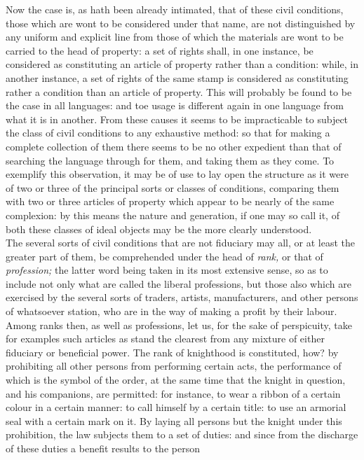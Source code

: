 \documentclass[12pt]{report}
\begin{document}
Now the case is, as hath been already intimated, that of these civil
conditions, those which are wont to be considered under that name, are
not distinguished by any uniform and explicit line from those of which
the materials are wont to be carried to the head of property: a set of
rights shall, in one instance, be considered as constituting an article
of property rather than a condition: while, in another instance, a set
of rights of the same stamp is considered as constituting rather a
condition than an article of property. This will probably be found to be
the case in all languages: and toe usage is different again in one
language from what it is in another. From these causes it seems to be
impracticable to subject the class of civil conditions to any exhaustive
method: so that for making a complete collection of them there seems to
be no other expedient than that of searching the language through for
them, and taking them as they come. To exemplify this observation, it
may be of use to lay open the structure as it were of two or three of
the principal sorts or classes of conditions, comparing them with two or
three articles of property which appear to be nearly of the same
complexion: by this means the nature and generation, if one may so call
it, of both these classes of ideal objects may be the more clearly
understood.\\
The several sorts of civil conditions that are not fiduciary may all, or
at least the greater part of them, be comprehended under the head of
\emph{rank,} or that of \emph{profession;} the latter word being taken
in its most extensive sense, so as to include not only what are called
the liberal professions, but those also which are exercised by the
several sorts of traders, artists, manufacturers, and other persons of
whatsoever station, who are in the way of making a profit by their
labour. Among ranks then, as well as professions, let us, for the sake
of perspicuity, take for examples such articles as stand the clearest
from any mixture of either fiduciary or beneficial power. The rank of
knighthood is constituted, how? by prohibiting all other persons from
performing certain acts, the performance of which is the symbol of the
order, at the same time that the knight in question, and his companions,
are permitted: for instance, to wear a ribbon of a certain colour in a
certain manner: to call himself by a certain title: to use an armorial
seal with a certain mark on it. By laying all persons but the knight
under this prohibition, the law subjects them to a set of duties: and
since from the discharge of these duties a benefit results to the person
\end{document}

